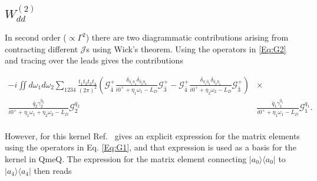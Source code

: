 \documentclass{article}
\newcommand{\oph}[2]{\ensuremath{|#1\rangle\langle#2|}}
\newcommand{\G}{\ensuremath{\mathcal{G}}}
\begin{document}
\subsection{$W^{(2)}_{dd}$}

In second order ($\propto\Gamma^2$) there are two diagrammatic contributions arising from contracting different $\mathcal{J}$s using Wick's theorem. Using the operators in \ref{Eq:G2} and tracing over the leads gives the contributions~\cite{gergs2015charge, gergs2017transport, gergs2018spin}

\begin{equation}
	\begin{split}
    -i\iint d\omega_1 d\omega_2\sum_{1234}\frac{t_1t_2t_3t_4}{(2\pi)^2}\left (\G_{\bar{4}}^+\frac{\delta_{\bar{\eta}_1\eta_4}\delta_{\bar{\eta}_2\eta_3}}{i0^++\eta_1\omega_1-L_D} \G_{\bar{3}}^{+}-\G_{\bar{4}}^+\frac{\delta_{\eta_1\bar{\eta}_3}\delta_{\bar{\eta}_2\eta_4}}{i0^++\eta_2\omega_2-L_D}\G_{\bar{3}}^{+} \right ) & \times \\
      \frac{\bar{q}_2\gamma_2^{\bar{q}_2}}{i0^++\eta_1\omega_1 + \eta_2\omega_2-L_D}\G_2^{q_2}&\frac{\bar{q}_1\gamma_1^{\bar{q}_1}}{i0^++\eta_1\omega_1-L_D}\G_1^{q_1}.
     \end{split}
    \label{Eq:W2Gergs}
\end{equation}
\\
However, for this kernel Ref.~\cite{leijnse2008kinetic} gives an explicit expression for the matrix elements using the operators in Eq. \ref{Eq:G1}, and that expression is used as a basis for the kernel in QmeQ. The expression for the matrix element connecting $\oph{a_0}{a_0}$ to $\oph{a_4}{a_4}$ then reads
\end{document}

